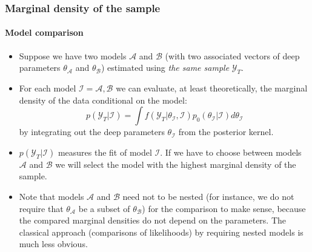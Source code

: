 \documentclass[10pt,slidestop]{beamer}
\newcommand{\AllSample}{ \mathcal Y_T }
\newcommand{\sample}{\mathcal Y_T}
\begin{document}
\begin{frame}
  \frametitle{Marginal density of the sample}
  \framesubtitle{Model comparison}
  \begin{itemize}

  \item Suppose we have two models $\mathcal{A}$ and $\mathcal{B}$ (with two associated
    vectors of deep parameters $\theta_\mathcal{A}$ and $\theta_\mathcal{B}$) estimated
    using \emph{the same sample} $\AllSample$.
    \bigskip
  \item For each model $\mathcal{I}=\mathcal{A},\mathcal{B}$ we can evaluate, at least
    theoretically, the marginal density of the data conditional on the model:
    \[
    p(\AllSample|\mathcal{I}) = \int
    f(\sample |\theta_{\mathcal{I}},\mathcal{I})p_0(\theta_{\mathcal{I}}|\mathcal{I}) d\theta_{\mathcal{I}}
    \]
    by integrating out the deep parameters $\theta_{\mathcal{I}}$ from
    the posterior kernel.
    \bigskip
  \item $p(\sample|\mathcal{I})$ measures the fit of model
    $\mathcal{I}$. If we have to choose between models $\mathcal A$
    and $\mathcal B$ we will select the model with the highest marginal
    density of the sample.
    \bigskip
  \item Note that models $\mathcal A$ and $\mathcal B$ need not to be
    nested (for instance, we do not require that $\theta_{\mathcal A}$
    be a subset of $\theta_{\mathcal B}$) for the comparison to make
    sense, because the compared marginal densities do not
    depend on the parameters. The classical approach
    (comparisons of likelihoods) by requiring nested models is much
    less obvious.
  \end{itemize}
\end{frame}
\end{document}
